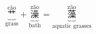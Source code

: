 \[ \underbrace{\overset{\text{cǎo}}{\text{艹}}}_{\text{grass}} + \underbrace{\overset{\text{zǎo}}{\text{澡}}}_{\text{bath}} = \underbrace{\overset{\text{zǎo}}{\text{藻}}}_{\text{aquatic grasses}} \]
